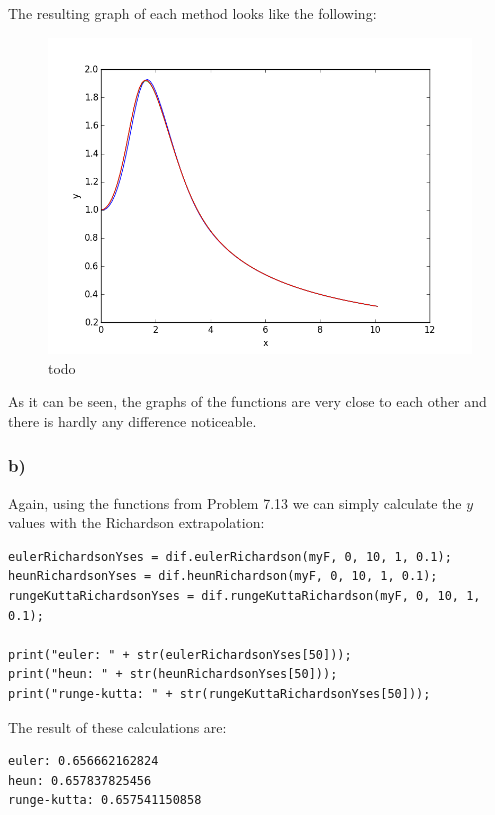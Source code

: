 The resulting graph of each method looks like the following:

\newpage

\begin{figure}[!ht]
\includegraphics[width=1\textwidth]{chapters/images/figure-7-14-a}
\caption{todo}
\end{figure}

As it can be seen, the graphs of the functions are very close to each other and there is hardly any difference noticeable.

\subsubsection{b)}

Again, using the functions from Problem 7.13 we can simply calculate the $y$ values with the Richardson extrapolation:

\begin{lstlisting}[caption=Problem 7.14 b)]
eulerRichardsonYses = dif.eulerRichardson(myF, 0, 10, 1, 0.1);
heunRichardsonYses = dif.heunRichardson(myF, 0, 10, 1, 0.1);
rungeKuttaRichardsonYses = dif.rungeKuttaRichardson(myF, 0, 10, 1, 0.1);

print("euler: " + str(eulerRichardsonYses[50]));
print("heun: " + str(heunRichardsonYses[50]));
print("runge-kutta: " + str(rungeKuttaRichardsonYses[50]));
\end{lstlisting}

The result of these calculations are:

\begin{lstlisting}[caption=Result of 7.14 b), keywordstyle=\color{black}]
euler: 0.656662162824
heun: 0.657837825456
runge-kutta: 0.657541150858
\end{lstlisting}

